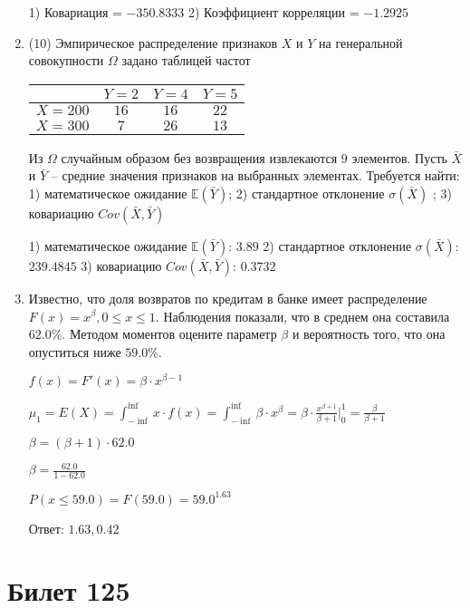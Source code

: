 \documentclass[a4paper,12pt]{article}
\begin{document}
\begin{enumerate}
1) Ковариация = $-350.8333$
2) Коэффициент корреляции = $-1.2925$


\item


(10) Эмпирическое распределение признаков $X$ и $Y$ на генеральной совокупности $\Omega$ задано таблицей частот  
 
\begin{tabular}{ | c | c | c | c | }
\hline
 & $Y = 2$ & $Y = 4$ & $Y = 5$  \\ \hline
$X = 200$ & $16$ & $16$ & $22$\\ \hline
$X = 300$ & $7$ & $26$ & $13$\\
\hline
\end{tabular}

Из $\Omega$ случайным образом без возвращения извлекаются $9$ элементов. 
Пусть $\bar X$ и $\bar Y$ – средние значения признаков на выбранных элементах. 
Требуется найти: 1) математическое ожидание $\mathbb{E}(\bar Y)$; 2) стандартное отклонение $\sigma(\bar X)$ ; 
3) ковариацию $Cov(\bar X, \bar Y)$




1) математическое ожидание $\mathbb{E}(\bar Y)$: $3.89$ 
2) стандартное отклонение $\sigma(\bar X)$: $239.4845$
3) ковариацию $Cov(\bar X, \bar Y)$: $0.3732$


\item

    
	Известно, что доля возвратов по кредитам в банке имеет распределение $F(x) = x^{\beta}, 0 \le x \le 1$. Наблюдения показали, что в среднем она составила $62.0$\%. Методом моментов оцените параметр $\beta$ и вероятность того, что она опуститься ниже $59.0$\%.
	


	

	$f(x) = F'(x) = \beta \cdot x^{\beta - 1}$

	$\mu_{1} = E(X) = \int_{-\inf}^{\inf}x \cdot f(x) = \int_{-\inf}^{\inf} \beta \cdot x^{\beta} = \beta \cdot \frac{x^{\beta + 1}}{\beta + 1}\bigg|_0^1 = \frac{\beta}{\beta + 1}$

	$\beta = (\beta + 1) \cdot 62.0$

	$\beta = \frac{62.0}{1 - 62.0}$

	$ P(x \le 59.0) = F(59.0) = 59.0^{1.63} $

    Ответ: $1.63, 0.42$
	


\end{enumerate}

\section{Билет 125}
\end{document}
